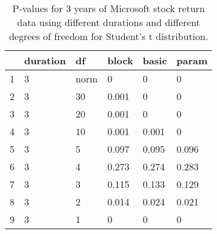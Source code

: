 \begin{table}[ht]
\centering
\caption{P-values for 3 years of Microsoft stock return 
                   data using different durations
  and different degrees of freedom for Student's t distribution.} 
\label{table:microsoft3}
\begin{tabular}{rlllll}
  \hline
 & duration & df & block & basic & param \\ 
  \hline
1 & 3 & norm & 0 & 0 & 0 \\ 
  2 & 3 & 30 & 0.001 & 0 & 0 \\ 
  3 & 3 & 20 & 0.001 & 0 & 0 \\ 
  4 & 3 & 10 & 0.001 & 0.001 & 0 \\ 
  5 & 3 & 5 & 0.097 & 0.095 & 0.096 \\ 
  6 & 3 & 4 & 0.273 & 0.274 & 0.283 \\ 
  7 & 3 & 3 & 0.115 & 0.133 & 0.129 \\ 
  8 & 3 & 2 & 0.014 & 0.024 & 0.021 \\ 
  9 & 3 & 1 & 0 & 0 & 0 \\ 
   \hline
\end{tabular}
\end{table}

